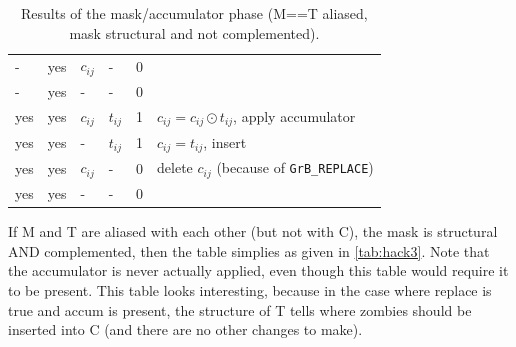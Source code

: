 \begin{table}
{\begin{tabular}{lllll|l}
    -  &yes & $c_{ij}$ &  -        & 0    &   \\
    -  &yes &  -       &  -        & 0    &   \\
\hline
    yes&yes & $c_{ij}$ & $t_{ij}$  & 1    &  $c_{ij} = c_{ij} \odot t_{ij}$, apply accumulator \\
    yes&yes &  -       & $t_{ij}$  & 1    &  $c_{ij} = t_{ij}$, insert \\
    yes&yes & $c_{ij}$ &  -        & 0    &  delete $c_{ij}$  (because of \verb'GrB_REPLACE') \\
    yes&yes &  -       &  -        & 0    &   \\
\hline
\end{tabular}
}
\caption{Results of the mask/accumulator phase (M==T aliased, mask structural and
not complemented). \label{tab:hack2}}
\end{table}

\newpage
If M and T are aliased with each other (but not with C), 
the mask is structural AND complemented, then
the table simplies as given in \ref{tab:hack3}.
Note that the accumulator is never actually applied, even though
this table would require it to be present.
This table looks interesting, because in the case where replace is true
and accum is present, the structure of T tells where zombies should be inserted
into C (and there are no other changes to make).

